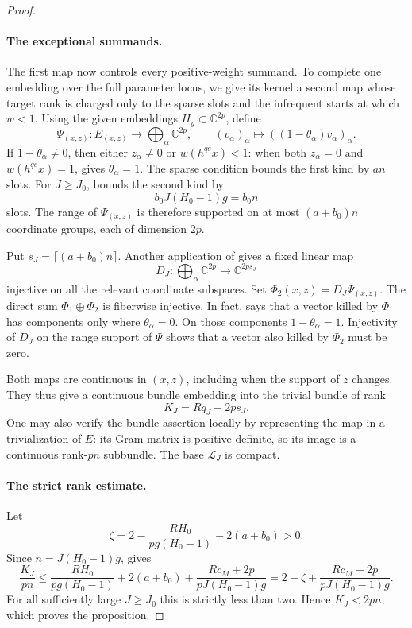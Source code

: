 \begin{proof}
\paragraph{The exceptional summands.}
The first map now controls every positive-weight summand. To complete
one embedding over the full parameter locus, we give its kernel a second
map whose target rank is charged only to the sparse slots and the
infrequent starts at which $w<1$.
Using the given embeddings $H_y\subset\mathbb C^{2p}$, define
\[
 \Psi_{(x,z)}:E_{(x,z)}\longrightarrow
                     \bigoplus_\alpha\mathbb C^{2p},
 \qquad
 (v_\alpha)_\alpha\longmapsto
                 ((1-\theta_\alpha)v_\alpha)_\alpha.
\]
If $1-\theta_\alpha\ne0$, then either $z_\alpha\ne0$ or
$w(h^{qe}x)<1$: when both $z_\alpha=0$ and $w(h^{qe}x)=1$,
 gives $\theta_\alpha=1$.
The sparse condition bounds the first kind by $an$ slots.  For
$J\geq J_0$,  bounds the second kind
by
\[
 b_0J(H_0-1)g=b_0n
\]
slots.  The range of $\Psi_{(x,z)}$ is therefore supported on at most
$(a+b_0)n$ coordinate groups, each of dimension $2p$.

Put $s_J=\lceil(a+b_0)n\rceil$.  Another application of
 gives a fixed linear map
\[
 D_J:\bigoplus_\alpha\mathbb C^{2p}\longrightarrow
                         \mathbb C^{2ps_J}
\]
injective on all the relevant coordinate subspaces.  Set
$\Phi_2(x,z)=D_J\Psi_{(x,z)}$.
The direct sum $\Phi_1\oplus\Phi_2$ is fiberwise injective.  In fact,
 says that a vector killed by $\Phi_1$ has
components only where $\theta_\alpha=0$.  On those components
$1-\theta_\alpha=1$.  Injectivity of $D_J$ on the range support of
$\Psi$ shows that a vector also killed by $\Phi_2$ must be zero.

Both maps are continuous in $(x,z)$, including when the support of $z$
changes.  They thus give a continuous bundle embedding into the
trivial bundle of rank
\begin{equation}
\label{eq:comparison-bundle-target-rank}
 K_J=Rq_J+2ps_J.
\end{equation}
One may also verify the bundle assertion locally by representing the
map in a trivialization of $E$: its Gram matrix is positive definite,
so its image is a continuous rank-$pn$ subbundle.  The base
$\mathcal L_J$ is compact.

\paragraph{The strict rank estimate.}
Let
\[
 \zeta=2-\frac{RH_0}{pg(H_0-1)}-2(a+b_0)>0.
\]
Since $n=J(H_0-1)g$,  gives
\[
 \frac{K_J}{pn}
 \leq \frac{RH_0}{pg(H_0-1)}+2(a+b_0)
            +\frac{Rc_M+2p}{pJ(H_0-1)g}
 =2-\zeta+\frac{Rc_M+2p}{pJ(H_0-1)g}.
\]
For all sufficiently large $J\geq J_0$ this is strictly less than
two.  Hence $K_J<2pn$, which proves the proposition.
\end{proof}
